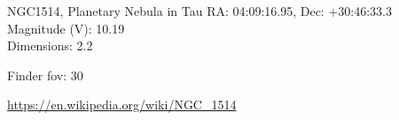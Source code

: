 \begin{block}{NGC1514, Planetary Nebula in Tau}
    RA: 04:09:16.95, Dec: +30:46:33.3 \\ 
    Magnitude (V): 10.19 \\ 
    Dimensions: 2.2 

    Finder fov: 30 

    \url{https://en.wikipedia.org/wiki/NGC_1514} 
\end{block}